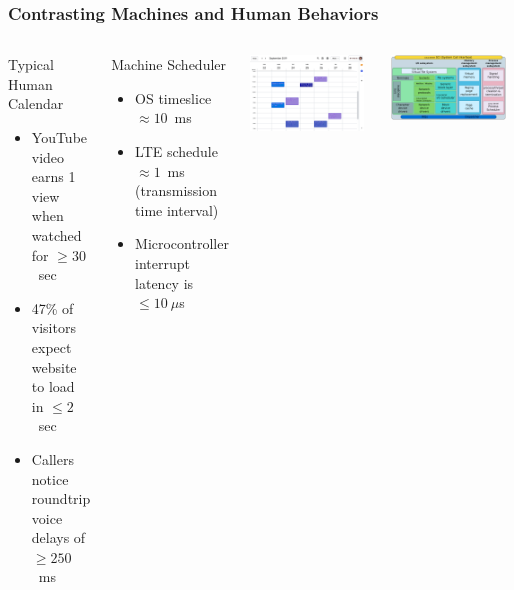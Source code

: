 \documentclass[10pt]{beamer}
\begin{document}
\begin{frame}
\frametitle{Contrasting Machines and Human Behaviors}
\begin{columns}
\begin{block}{Typical Human Calendar}
  \begin{itemize}
  \item YouTube video earns 1 view when watched for $\geq 30$~sec
  \item 47\% of visitors expect website to load in $\leq 2$~sec
  \item Callers notice roundtrip voice delays of $\geq 250$~ms
  \end{itemize}
\end{block}


\begin{block}{Machine Scheduler}
  \begin{itemize}
  \item OS timeslice $\approx 10$~ms
  \item LTE schedule $\approx 1$~ms (transmission time interval)
  \item Microcontroller interrupt latency is $\leq 10~\mu$s
  \end{itemize}
\end{block}
  \begin{center}
  \includegraphics[width=0.95\textwidth]{Figures/Scheduler-Human.png} \\
  \end{center}
  \vfill
  \begin{center}
  \includegraphics[width=0.95\textwidth]{Figures/Scheduler-Machine.png} \\

\end{center}
\end{columns}
\end{frame}
\end{document}

